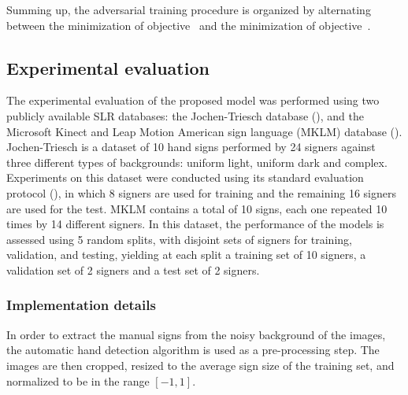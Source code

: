 Summing up, the adversarial training procedure is organized by alternating between the minimization of objective~ and the minimization of objective~.

\subsection{Experimental evaluation}
\label{sec:adv_signer_inv_experiments}

\hspace{\parindent}The experimental evaluation of the proposed model was performed using two publicly available SLR databases: the Jochen-Triesch database (\citet{Triesch2001}), and the Microsoft Kinect and Leap Motion American sign language (MKLM) database (\citet{Marin2014, Marin2016}).
Jochen-Triesch is a dataset of 10 hand signs performed by 24 signers against three different types of backgrounds: uniform light, uniform dark and complex. Experiments on this dataset were conducted using its standard evaluation protocol (\citet{Just2006}), in which 8 signers are used for training and the remaining 16 signers are used for the test. MKLM contains a total of 10 signs, each one repeated 10 times by 14 different signers. In this dataset, the performance of the models is assessed using 5 random splits, with disjoint sets of signers for training, validation, and testing, yielding at each split a training set of 10 signers, a validation set of 2 signers and a test set of 2 signers.

\subsubsection{Implementation details}
In order to extract the manual signs from the noisy background of the images, the automatic hand detection algorithm \cite{Ferreira2018} is used as a pre-processing step. The images are then cropped, resized to the average sign size of the training set, and normalized to be in the range $[-1,1]$.

